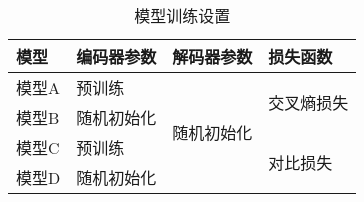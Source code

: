\begin{table}[htbp]
\centering
\caption{模型训练设置}  
\label{tab:same-adain}
\begin{tabular}{@{}llll@{}}
\toprule
模型       & 编码器参数 & 解码器参数                                      & 损失函数                           \\ \midrule
模型A & 预训练   & \multicolumn{1}{c}{\multirow{4}{*}{随机初始化}} & \multirow{2}{*}{交叉熵损失} \\
模型B & 随机初始化 & \multicolumn{1}{c}{}                       &                                \\
模型C    & 预训练   &                 & \multirow{2}{*}{对比损失} \\
模型D    & 随机初始化 &                                            &                                \\ \bottomrule
\end{tabular}
\end{table}